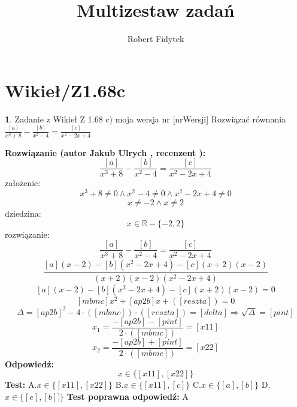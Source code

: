 \documentclass[12pt, a4paper]{article}
\title{Multizestaw zadań}
\author{Robert Fidytek}
\date{}
\theoremstyle{definition} %
\newtheorem{zad}{}
\newcommand{\kategoria}[1]{\section{#1}} %
\newcommand{\zadStart}[1]{\begin{zad}#1\newline} %
\newcommand{\zadStop}{\end{zad}}   %
\newcommand{\rozwStart}[2]{\noindent \textbf{Rozwiązanie (autor #1 , recenzent #2): }\newline} %
\newcommand{\rozwStop}{\newline}                                            %
\newcommand{\odpStart}{\noindent \textbf{Odpowiedź:}\newline}    %
\newcommand{\odpStop}{\newline}                                             %
\newcommand{\testStart}{\noindent \textbf{Test:}\newline} %
\newcommand{\testStop}{\newline} %
\newcommand{\kluczStart}{\noindent \textbf{Test poprawna odpowiedź:}\newline} %
\newcommand{\kluczStop}{\newline} %
\begin{document}
\maketitle


\kategoria{Wikieł/Z1.68c}
\zadStart{Zadanie z Wikieł Z 1.68 c) moja wersja nr [nrWersji]}
Rozwiązać równania $\frac{[a]}{x^{3}+8}-\frac{[b]}{x^{2}-4}=\frac{[c]}{x^{2}-2x+4}$
\zadStop
\rozwStart{Jakub Ulrych}{}
$$\frac{[a]}{x^{3}+8}-\frac{[b]}{x^{2}-4}=\frac{[c]}{x^{2}-2x+4}$$
założenie: $$x^{3}+8\neq0 \land x^{2}-4\neq0 \land x^{2}-2x+4\neq0$$
$$x\neq-2 \land x\neq2$$
dziedzina:$$x\in \mathbb{R}-\{-2,2\}$$
rozwiązanie:$$\frac{[a]}{x^{3}+8}-\frac{[b]}{x^{2}-4}=\frac{[c]}{x^{2}-2x+4}$$
$$\frac{[a](x-2)-[b](x^{2}-2x+4)-[c](x+2)(x-2)}{(x+2)(x-2)(x^{2}-2x+4)}$$
$$[a](x-2)-[b](x^{2}-2x+4)-[c](x+2)(x-2)=0$$
$$[mbmc]x^{2}+[ap2b]x+([reszta])=0$$
$$\Delta=[ap2b]^{2}-4\cdot([mbmc])\cdot([reszta])=[delta]\Rightarrow\sqrt{\Delta}=[pint]$$
$$x_{1}=\frac{-[ap2b]-[pint]}{2\cdot([mbmc])}=[x11]$$
$$x_{2}=\frac{-[ap2b]+[pint]}{2\cdot([mbmc])}=[x22]$$
\rozwStop
\odpStart
$$x\in\{[x11],[x22]\}$$
\odpStop
\testStart
A.$x\in\{[x11],[x22]\}$
B.$x\in\{[x11],[c]\}$
C.$x\in\{[a],[b]\}$
D.$x\in\{[e],[b]]\}$
\testStop
\kluczStart
A
\kluczStop
\end{document}
